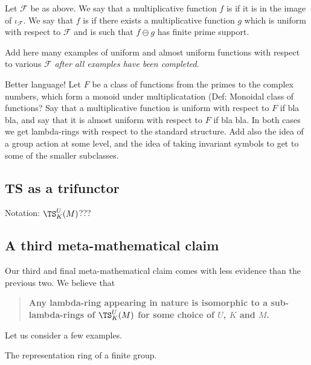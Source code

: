 \documentclass[a4paper]{article}
\begin{document}
\begin{definition}
Let $\mathcal{F}$ be as above. We say that a multiplicative function $f$ is  if it is in the image of $\iota_{\mathcal{F}}$. We say that $f$ is  if there exists a multiplicative function $g$ which is uniform with respect to $\mathcal{F}$ and is such that $f \ominus g$ has finite prime support. 
\end{definition}

\begin{example}
Add here many examples of uniform and almost uniform functions with respect to various $\mathcal{F}$ \emph{after all examples have been completed}.
\end{example}

Better language! Let $F$ be a class of functions from the primes to the complex numbers, which form a monoid under multiplicatation (Def: Monoidal class of functions? Say that a multiplicative function is uniform with respect to $F$ if bla bla, and say that it is almost uniform with respect to $F$ if bla bla. In both cases we get lambda-rings with respect to the standard structure. Add also the idea of a group action at some level, and the idea of taking invariant symbols to get to some of the smaller subclasses.


\subsection{\textbf{TS} as a trifunctor}

Notation: $\TS_K^U(M)$???
\subsection{A third meta-mathematical claim}

Our third and final meta-mathematical claim comes with less evidence than the previous two. We  believe that

\begin{quote}
\textbf{Any lambda-ring appearing in nature is isomorphic to a sub-lambda-rings of $\TS^U_K(M)$ for some choice of $U$, $K$ and $M$.}
\end{quote}


Let us consider a few examples.

\begin{example}
The representation ring of a finite group.  
\end{example}
\end{document}
